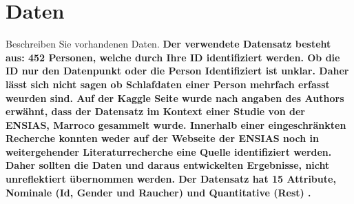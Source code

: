 \documentclass[usegeometry=true]{scrartcl}
\begin{document}
\section{Daten}
Beschreiben Sie vorhandenen Daten. 
\textbf{Der verwendete Datensatz besteht aus: 452 Personen, welche durch Ihre ID identifiziert werden. Ob die ID nur den Datenpunkt oder die Person Identifiziert ist unklar. Daher lässt sich nicht sagen ob Schlafdaten einer Person mehrfach erfasst weurden sind. 
Auf der Kaggle Seite wurde nach angaben des Authors erwähnt, dass der Datensatz im Kontext einer Studie von der ENSIAS, Marroco gesammelt wurde.
Innerhalb einer eingeschränkten Recherche konnten weder auf der Webseite der ENSIAS noch in weitergehender Literaturrecherche eine Quelle identifiziert werden. Daher sollten die Daten und daraus entwickelten Ergebnisse, nicht unreflektiert übernommen werden. 
Der Datensatz hat 15 Attribute, Nominale (Id, Gender und Raucher) und Quantitative (Rest) .\\

}
\end{document}
